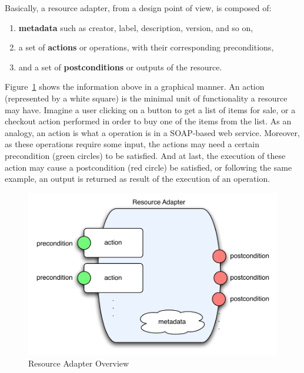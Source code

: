 \documentclass{fast_latex}
\begin{document}
Basically, a resource adapter, from a design point of view, is composed of:

\begin{enumerate}
	\item \textbf{metadata} such as creator, label, description, version, and so on,
	\item a set of \textbf{actions} or operations, with their corresponding preconditions,
	\item and a set of \textbf{postconditions} or outputs of the resource.
\end{enumerate}

Figure~\ref{fig:resource_adapter_overview} shows the information above in a graphical manner. An action (represented by a white square) is the minimal unit of functionality a resource may have. Imagine a user clicking on a button to get a list of items for sale, or a checkout action performed in order to buy one of the items from the list. As an analogy, an action is what a operation is in a SOAP-based web service. Moreover, as these operations require some input, the actions may need a certain precondition (green circles) to be satisfied. And at last, the execution of these action may cause a postcondition (red circle) be satisfied, or following the same example, an output is returned as result of the execution of an operation.

\begin{figure}[!htb]
  \begin{center}
    \includegraphics[width=12cm]{images/resource_adapter.pdf}
    \caption{Resource Adapter Overview}
    \label{fig:resource_adapter_overview}
  \end{center}
\end{figure}

\end{document}
